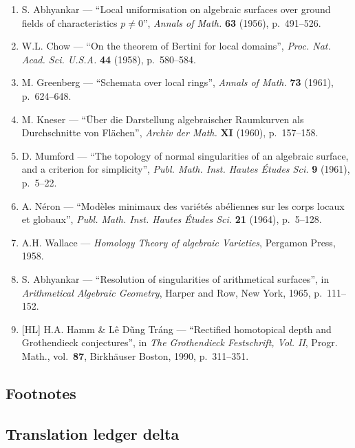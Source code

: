 \documentclass[
]{article}
\providecommand{\tightlist}{%
  \setlength{\itemsep}{0pt}\setlength{\parskip}{0pt}}
\begin{document}
\begin{enumerate}
\def\labelenumi{\arabic{enumi}.}
\tightlist
\item
  S. Abhyankar --- ``Local uniformisation on algebraic surfaces over
  ground fields of characteristics \(p \neq 0\)'', \emph{Annals of
  Math.} \textbf{63} (1956), p.~491--526.
\item
  W.L. Chow --- ``On the theorem of Bertini for local domains'',
  \emph{Proc. Nat. Acad. Sci. U.S.A.} \textbf{44} (1958), p.~580--584.
\item
  M. Greenberg --- ``Schemata over local rings'', \emph{Annals of Math.}
  \textbf{73} (1961), p.~624--648.
\item
  M. Kneser --- ``Über die Darstellung algebraischer Raumkurven als
  Durchschnitte von Flächen'', \emph{Archiv der Math.} \textbf{XI}
  (1960), p.~157--158.
\item
  D. Mumford --- ``The topology of normal singularities of an algebraic
  surface, and a criterion for simplicity'', \emph{Publ. Math. Inst.
  Hautes Études Sci.} \textbf{9} (1961), p.~5--22.
\item
  A. Néron --- ``Modèles minimaux des variétés abéliennes sur les corps
  locaux et globaux'', \emph{Publ. Math. Inst. Hautes Études Sci.}
  \textbf{21} (1964), p.~5--128.
\item
  A.H. Wallace --- \emph{Homology Theory of algebraic Varieties},
  Pergamon Press, 1958.
\item
  S. Abhyankar --- ``Resolution of singularities of arithmetical
  surfaces'', in \emph{Arithmetical Algebraic Geometry}, Harper and Row,
  New York, 1965, p.~111--152.
\item
  {[}HL{]} H.A. Hamm \& Lê Dũng Tráng --- ``Rectified homotopical depth
  and Grothendieck conjectures'', in \emph{The Grothendieck Festschrift,
  Vol. II}, Progr. Math., vol.~\textbf{87}, Birkhäuser Boston, 1990,
  p.~311--351.
\end{enumerate}

\subsection{Footnotes}\label{footnotes-1}

\subsection{Translation ledger delta}\label{translation-ledger-delta-1}
\end{document}
